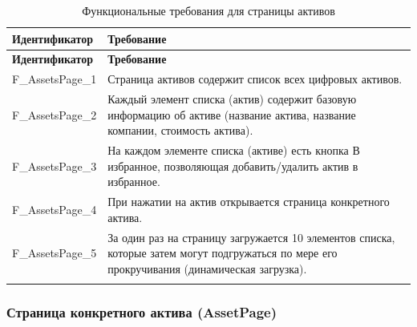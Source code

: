 \documentclass[a4paper, 14pt]{article}
\begin{document}
\begin{longtable}{| p{} | p{} |}
    \hline
    \textbf{Идентификатор}          & \textbf{Требование}                                                                                                                                                                \\
    \hline
    \endfirsthead
    \hline
    \textbf{Идентификатор}          & \textbf{Требование}                                                                                                                                                                \\
    \hline
    \endhead

    F\_AssetsPage\_1                & Страница активов содержит список всех цифровых активов.                                                                                                                            \\ \hline
    F\_AssetsPage\_2                & Каждый элемент списка (актив) содержит базовую информацию об активе (название актива, название компании, стоимость актива).                                                        \\ \hline
    F\_AssetsPage\_3                & На каждом элементе списка (активе) есть кнопка В избранное, позволяющая добавить/удалить актив в избранное.                                                                        \\ \hline
    F\_AssetsPage\_4                & При нажатии на актив открывается страница конкретного актива.                                                                                                                      \\ \hline
    F\_AssetsPage\_5                & За один раз на страницу загружается 10 элементов списка, которые затем могут подгружаться по мере его прокручивания (динамическая загрузка).                                       \\ \hline

    \caption{Функциональные требования для страницы активов}
\end{longtable}

\subsubsection{Страница конкретного актива (AssetPage)}
\end{document}
